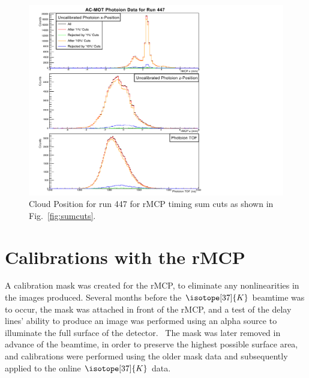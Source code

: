 \begin{figure}[h!tb]
	\centering
	\includegraphics[width=.999\linewidth]
	{Figures/rMCP_xyz_comparecuts447.pdf}
	\caption[Cloud Position for run 447 for various rMCP timing sum cuts]{Cloud Position for run 447 for rMCP timing sum cuts as shown in Fig.~\ref{fig:sumcuts}.}	
	\label{fig:position_with_sumcuts}
\end{figure}


\FloatBarrier  %
\section{Calibrations with the rMCP}
\label{sec:rmcp_cals}
A calibration mask was created for the rMCP, to eliminate any nonlinearities in the images produced.  Several months before the $\isotope[37]{K}$ beamtime was to occur, the mask was attached in front of the rMCP, and a test of the delay lines' ability to produce an image was performed using an alpha source to illuminate the full surface of the detector.~  The mask was later removed in advance of the beamtime, in order to preserve the highest possible surface area, and calibrations were performed using the older mask data and subsequently applied to the online $\isotope[37]{K}$ data.%


